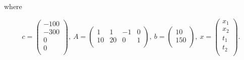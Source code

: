 where

$$
c = 
\left(
  \begin{array}{c}
    -100 \\
    -300 \\
    0 \\
    0 \\
  \end{array}
\right),~
A = 
\left(
  \begin{array}{cccc}
    1 & 1 & -1 & 0 \\
    10 & 20 & 0 & 1 \\
  \end{array}
\right),~
b =
\left(
  \begin{array}{c}
    10 \\
    150 \\
  \end{array}
\right),~
x =
\left(
  \begin{array}{c}
    x_1 \\
    x_2 \\
    t_1 \\
    t_2 \\
  \end{array}
\right).
$$
